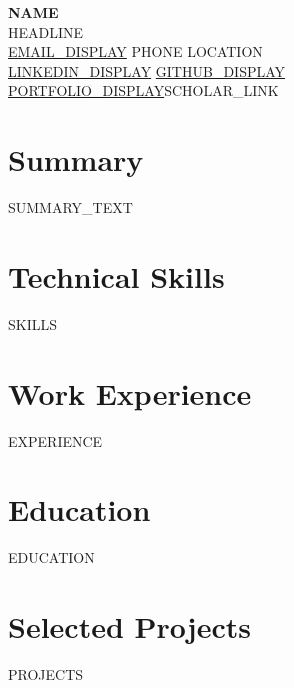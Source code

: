 \documentclass[letterpaper,10pt]{article}
\begin{document}
\begin{center}
  {\LARGE\bfseries\color{accent} {{NAME}} }\\[3pt]
  {\normalsize {{HEADLINE}} }\\[4pt]
  \small
  \href{mailto:{{EMAIL_URL}}}{{{EMAIL_DISPLAY}}} \textbar{}
  {{PHONE}} \textbar{}
  {{LOCATION}}\\
  \href{{{LINKEDIN_URL}}}{{{LINKEDIN_DISPLAY}}} \textbar{}
  \href{{{GITHUB_URL}}}{{{GITHUB_DISPLAY}}} \textbar{}
  \href{{{PORTFOLIO_URL}}}{{{PORTFOLIO_DISPLAY}}}{{SCHOLAR_LINK}}
\end{center}

\section*{Summary}
{{SUMMARY_TEXT}}

\section*{Technical Skills}
{{SKILLS}}

\section*{Work Experience}
{{EXPERIENCE}}

\section*{Education}
{{EDUCATION}}

\section*{Selected Projects}
\begin{tightitemize}
{{PROJECTS}}
\end{tightitemize}
\end{document}

